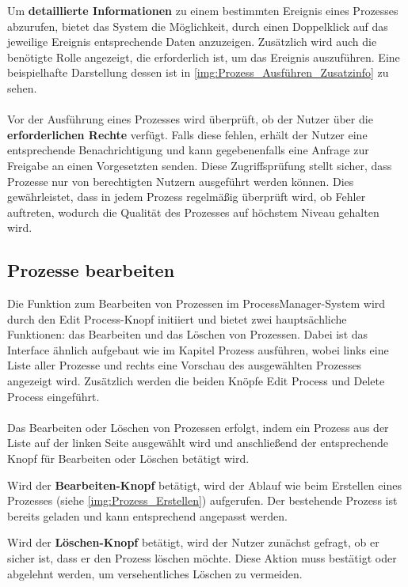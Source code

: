 Um \textbf{detaillierte Informationen} zu einem bestimmten Ereignis eines Prozesses abzurufen, bietet das System die Möglichkeit, durch einen Doppelklick auf das jeweilige Ereignis entsprechende Daten anzuzeigen. Zusätzlich wird auch die benötigte Rolle angezeigt, die erforderlich ist, um das Ereignis auszuführen. Eine beispielhafte Darstellung dessen ist in \autoref{img:Prozess_Ausführen_Zusatzinfo} zu sehen.\\
\\
Vor der Ausführung eines Prozesses wird überprüft, ob der Nutzer über die \textbf{erforderlichen Rechte} verfügt. Falls diese fehlen, erhält der Nutzer eine entsprechende Benachrichtigung und kann gegebenenfalls eine Anfrage zur Freigabe an einen Vorgesetzten senden. Diese Zugriffsprüfung stellt sicher, dass Prozesse nur von berechtigten Nutzern ausgeführt werden können. Dies gewährleistet, dass in jedem Prozess regelmäßig überprüft wird, ob Fehler auftreten, wodurch die Qualität des Prozesses auf höchstem Niveau gehalten wird.

\subsection*{Prozesse bearbeiten}
Die Funktion zum Bearbeiten von Prozessen im ProcessManager-System wird durch den \glqq Edit Process\grqq{}-Knopf initiiert und bietet zwei hauptsächliche Funktionen: das Bearbeiten und das Löschen von Prozessen.
Dabei ist das Interface ähnlich aufgebaut wie im Kapitel \glqq Prozess ausführen\grqq{}, wobei links eine Liste aller Prozesse und rechts eine Vorschau des ausgewählten Prozesses angezeigt wird. Zusätzlich werden die beiden Knöpfe \glqq Edit Process\grqq{} und \glqq Delete Process\grqq{} eingeführt.\\
\\
Das Bearbeiten oder Löschen von Prozessen erfolgt, indem ein Prozess aus der Liste auf der linken Seite ausgewählt wird und anschließend der entsprechende Knopf für Bearbeiten oder Löschen betätigt wird.

Wird der \textbf{Bearbeiten-Knopf} betätigt, wird der Ablauf wie beim Erstellen eines Prozesses (siehe \autoref{img:Prozess_Erstellen}) aufgerufen. Der bestehende Prozess ist bereits geladen und kann entsprechend angepasst werden.

Wird der \textbf{Löschen-Knopf} betätigt, wird der Nutzer zunächst gefragt, ob er sicher ist, dass er den Prozess löschen möchte. Diese Aktion muss bestätigt oder abgelehnt werden, um versehentliches Löschen zu vermeiden.\\
\\

